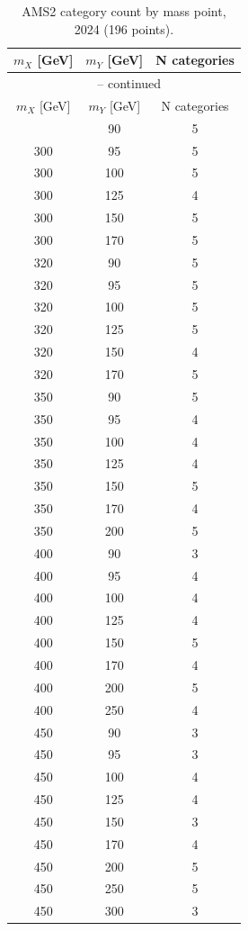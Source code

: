 \begin{longtable}{c c c}
\caption{AMS2 category count by mass point, 2024 (196 points).}
\label{tab:category_count_2024} \\
\hline
$m_X$ [GeV] & $m_Y$ [GeV] & N categories \\
\hline
\endfirsthead
\multicolumn{3}{c}{\tablename\ \thetable{} -- continued} \\
\hline
$m_X$ [GeV] & $m_Y$ [GeV] & N categories \\
\hline
\endhead
\hline
\endfoot
\hline
\endlastfoot
300 & 90 & 5 \\
300 & 95 & 5 \\
300 & 100 & 5 \\
300 & 125 & 4 \\
300 & 150 & 5 \\
300 & 170 & 5 \\
320 & 90 & 5 \\
320 & 95 & 5 \\
320 & 100 & 5 \\
320 & 125 & 5 \\
320 & 150 & 4 \\
320 & 170 & 5 \\
350 & 90 & 5 \\
350 & 95 & 4 \\
350 & 100 & 4 \\
350 & 125 & 4 \\
350 & 150 & 5 \\
350 & 170 & 4 \\
350 & 200 & 5 \\
400 & 90 & 3 \\
400 & 95 & 4 \\
400 & 100 & 4 \\
400 & 125 & 4 \\
400 & 150 & 5 \\
400 & 170 & 4 \\
400 & 200 & 5 \\
400 & 250 & 4 \\
450 & 90 & 3 \\
450 & 95 & 3 \\
450 & 100 & 4 \\
450 & 125 & 4 \\
450 & 150 & 3 \\
450 & 170 & 4 \\
450 & 200 & 5 \\
450 & 250 & 5 \\
450 & 300 & 3 \\

\end{longtable}
